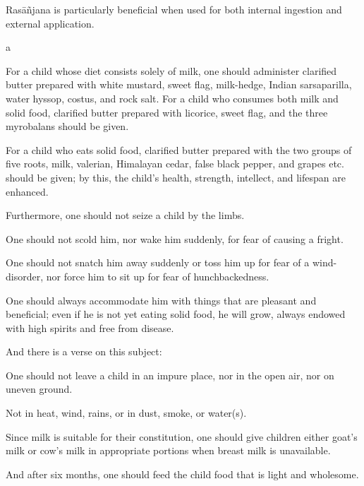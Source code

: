 \begin{translation}
\begin{tt}
\begin{sloka}
Rasāñjana is particularly beneficial when used for both internal
ingestion and external application.
\end{sloka}a

\item[45]

For a child whose diet consists solely of milk, one should administer
clarified butter prepared with white mustard, sweet flag, milk-hedge,
Indian sarsaparilla, water hyssop, costus, and rock salt. For a child
who consumes both milk and solid food, clarified butter prepared with
licorice, sweet flag, and the three myrobalans should be given.

For a child who eats solid food, clarified butter prepared with the two
groups of five roots, milk, valerian, Himalayan cedar, false black
pepper, and grapes etc. should be given; by this, the
child's health, strength, intellect, and lifespan are
enhanced.

\item[46]

Furthermore, one should not seize a child by the limbs.

One should not scold him, nor wake him suddenly, for fear of causing a
fright.

One should not snatch him away suddenly or toss him up for fear of a
wind-disorder, nor force him to sit up for fear of hunchbackedness.

One should always accommodate him with things that are pleasant and
beneficial; even if he is not yet eating solid food, he will grow,
always endowed with high spirits and free from disease.

\item[47]

And there is a verse on this subject:~

One should not leave a child in an impure place, nor in the open air,
nor on uneven ground.

Not in heat, wind, rains, or in dust, smoke, or water(s).

\item[48]

Since milk is suitable for their constitution, one should give children
either goat's milk or cow's milk in
appropriate portions when breast milk is unavailable.

\item[49]

And after six months, one should feed the child food that is light and
wholesome.

\item[50]


\end{tt}
\end{translation}
